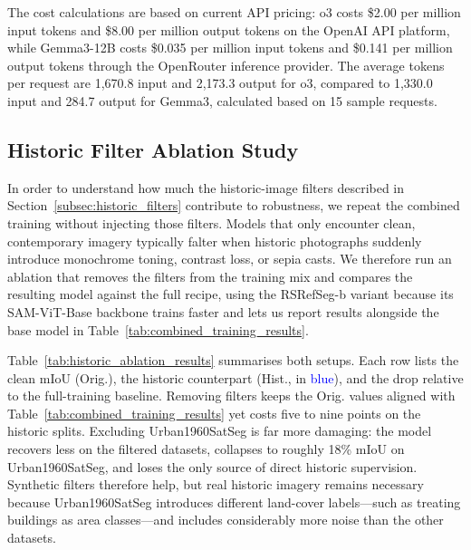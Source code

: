 The cost calculations are based on current API pricing: o3 costs \$2.00 per million input tokens and \$8.00 per million output tokens on the OpenAI API platform, while Gemma3-12B costs \$0.035 per million input tokens and \$0.141 per million output tokens through the OpenRouter inference provider. The average tokens per request are 1,670.8 input and 2,173.3 output for o3, compared to 1,330.0 input and 284.7 output for Gemma3, calculated based on 15 sample requests.

\subsection{Historic Filter Ablation Study}

In order to understand how much the historic-image filters described in Section~\ref{subsec:historic_filters} contribute to robustness, we repeat the combined training without injecting those filters. Models that only encounter clean, contemporary imagery typically falter when historic photographs suddenly introduce monochrome toning, contrast loss, or sepia casts. We therefore run an ablation that removes the filters from the training mix and compares the resulting model against the full recipe, using the RSRefSeg-b variant because its SAM-ViT-Base backbone trains faster and lets us report results alongside the base model in Table~\ref{tab:combined_training_results}.

Table~\ref{tab:historic_ablation_results} summarises both setups. Each row lists the clean mIoU (Orig.), the historic counterpart (Hist., in \textcolor{blue}{blue}), and the drop relative to the full-training baseline. Removing filters keeps the Orig. values aligned with Table~\ref{tab:combined_training_results} yet costs five to nine points on the historic splits. Excluding Urban1960SatSeg is far more damaging: the model recovers less on the filtered datasets, collapses to roughly 18\% mIoU on Urban1960SatSeg, and loses the only source of direct historic supervision. Synthetic filters therefore help, but real historic imagery remains necessary because Urban1960SatSeg introduces different land-cover labels—such as treating buildings as area classes—and includes considerably more noise than the other datasets.

